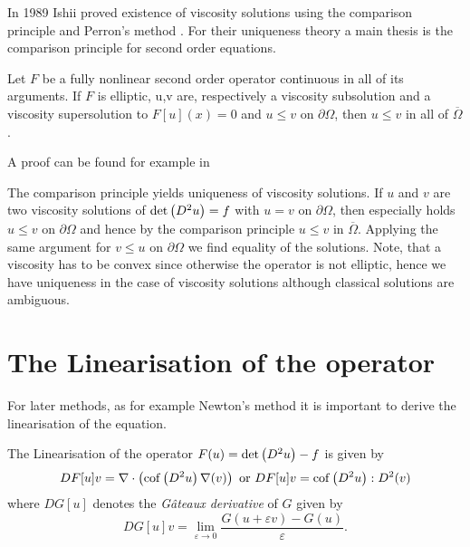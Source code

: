 In 1989 Ishii proved existence of viscosity solutions using the comparison principle and Perron's method \cite{Ishii1989}. For their uniqueness theory a main thesis is the comparison principle for second order equations.

\begin{theorem}
	Let $F$ be a fully nonlinear second order operator continuous in all of its arguments.
	If $F$ is elliptic,	u,v are, respectively a viscosity subsolution and a viscosity supersolution to $F[u](x)=0$ and $u \leq v$ on $\partial \Omega$, then $u \leq v$ in all of $\overline \Omega$.
\end{theorem}
A proof can be found for example in \cite[Theorem 17.1]{GT1983}

The comparison principle yields uniqueness of viscosity solutions. If $u$ and $v$ are two viscosity solutions of $\det{\left(D^2 u\right)}=f$ with $u=v$ on $\partial \Omega$, then especially holds $u \leq v$ on $\partial \Omega$ and hence by the comparison principle $u \leq v$ in  $\overline \Omega$. Applying the same argument for $v \leq u$ on $\partial \Omega$ we find equality of the solutions. Note, that a viscosity has to be convex since otherwise the \MA operator is not elliptic, hence we have uniqueness in the case of viscosity solutions although classical solutions are ambiguous.

\section{The Linearisation of the \MA operator}\label{sec: linearisation}

For later methods, as for example Newton's method it is important to derive the linearisation of the \MA equation. 
	\begin{theorem}[Linearisation] \label{thm: linearisation}
		The Linearisation of the \MA operator $F(u)=\det{\left(D^2u\right)}-f$ is given by
		\begin{align}
			DF[u]v = \nabla \cdot \left( \operatorname{cof} \left( D^2 u  \right) \nabla (v) \right) \text{ or } DF[u]v=\operatorname{cof} \left( D^2 u \right):D^2 (v)		\end{align}
	where $DG[u]$ denotes the \emph{G\^ateaux derivative} of $G$ given by
	\[
		DG[u]v = \lim\limits_{\varepsilon \rightarrow 0} \frac { G(u+\varepsilon v) - G(u)}\varepsilon.
	\]
	\end{theorem}
		
